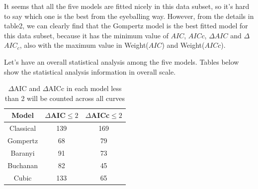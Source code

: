 \documentclass[11pt]{article}
\begin{document}
\begin{table}[H] \centering
    \caption{$R^2$, AIC, AICc, $\Delta$AIC, $\Delta$AICc and Akaike Weight for each model curve in fig2}
    \label{table2}
\end{table}

It seems that all the five models are fitted nicely in this data subset, so it’s hard to say which one is the best from the eyeballing way. However, from the details in table2, we can clearly find that the Gompertz model is the best fitted model for this data subset, because it has the minimum value of $AIC$, $AICc$, $\Delta$$AIC$ and $\Delta$$AIC_c$, also with the maximum value in Weight($AIC$) and Weight($AICc$).

Let's have an overall statistical analysis among the five models. Tables below show the  statistical analysis information in overall scale.

\begin{table}[H] \centering
    \begin{tabular}{c|c|c}
        \hline
        Model & $\Delta$AIC$\leqslant2$ & $\Delta$AICc$\leqslant2$ \\
        \hline
        Classical & 139 & 169\\
        Gompertz & 68 & 79\\
        Baranyi & 91 & 73\\
        Buchanan & 82 & 45\\
        Cubic & 133 & 65\\
        \hline
    \end{tabular}
    \caption{$\Delta$AIC and $\Delta$AICc in each model less than 2 will be counted across all curves} 
    \label{table3}
\end{table}
\end{document}
